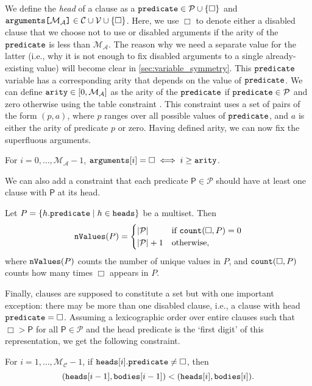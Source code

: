 \documentclass[runningheads]{llncs}
\newcommand{\variable}[1]{\texttt{\textup{#1}}}
\newcommand{\arrayd}[3]{\variable{{#1}[}{#2}\variable{]} \in {#3}}
\newcommand{\predicates}{\mathcal{P}}
\newcommand{\variables}{\mathcal{V}}
\newcommand{\constants}{\mathcal{C}}
\newcommand{\maxArity}{\mathcal{M}_{\mathcal{A}}}
\newcommand{\maxNumClauses}{\mathcal{M}_{\mathcal{C}}}
\begin{document}
We define the \emph{head} of a clause as a $\variable{predicate} \in \predicates{}
\cup \{ \Box \}$ and $\arrayd{arguments}{\maxArity{}}{\constants{} \cup
  \variables{}} \cup \{ \Box \}$. Here, we use $\Box$ to denote either a
disabled clause that we choose not to use or disabled arguments if the arity of
the $\variable{predicate}$ is less than $\maxArity{}$. The reason why we need a
separate value for the latter (i.e., why it is not enough to fix disabled
arguments to a single already-existing value) will become clear in
\cref{sec:variable_symmetry}. This $\variable{predicate}$ variable has a
corresponding arity that depends on the value of $\variable{predicate}$. We can
define $\variable{arity} \in [0, \maxArity{}]$ as the arity of the
$\variable{predicate}$ if $\variable{predicate} \in \predicates{}$ and zero
otherwise using the table constraint \cite{DBLP:conf/cpaior/MairyDL15}. This
constraint uses a set of pairs of the form $(p, a)$, where $p$ ranges over all
possible values of $\variable{predicate}$, and $a$ is either the arity of
predicate $p$ or zero. Having defined arity, we can now fix the superfluous
arguments.
\begin{constraint} \label{constr:arity}
  For $i = 0, \dots, \maxArity{} - 1$, $\variable{arguments}[i] = \Box \iff i
  \ge \variable{arity}$.
\end{constraint}
We can also add a constraint that each predicate $\mathsf{P} \in \predicates{}$
should have at least one clause with $\mathsf{P}$ at its head.
\begin{constraint}
  Let $P = \{ h.\variable{predicate} \mid h \in \variable{heads} \}$ be a
  multiset. Then
  \[
    \variable{nValues}(P) = \begin{cases}
      |\predicates{}| & \text{if } \variable{count}(\Box, P) = 0 \\
      |\predicates{}| + 1 & \text{otherwise,}
    \end{cases}
  \]
  where $\variable{nValues}(P)$ counts the number of unique values in $P$, and
  $\variable{count}(\Box, P)$ counts how many times $\Box$ appears in $P$.
\end{constraint}
Finally, clauses are supposed to constitute a set but with one important
exception: there may be more than one disabled clause, i.e., a clause with head
$\variable{predicate} = \Box$. Assuming a lexicographic order over entire
clauses such that $\Box > \mathsf{P}$ for all $\mathsf{P} \in \predicates{}$ and
the head predicate is the `first digit' of this representation, we get the
following constraint.
\begin{constraint}
  For $i = 1, \dots, \maxNumClauses{} - 1$, if $\variable{heads}[i].\variable{predicate}
  \ne \Box$, then
  \[
    (\variable{heads}[i-1], \variable{bodies}[i-1]) < (\variable{heads}[i],
    \variable{bodies}[i]).
  \]
\end{constraint}
\end{document}
